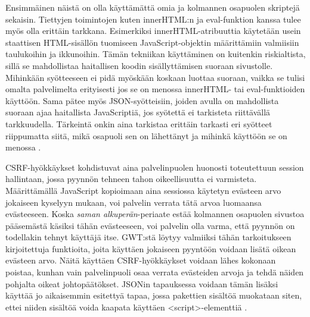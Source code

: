 Ensimmäinen näistä on olla käyttämättä omia ja kolmannen osapuolen skriptejä sekaisin. Tiettyjen toimintojen kuten innerHTML:n ja eval-funktion kanssa tulee myös olla erittäin tarkkana.
Esimerkiksi innerHTML-atribuuttia käytetään usein staattisen HTML-sisällön tuomiseen JavaScript-objektin määrittämiin valmiisiin taulukoihin ja ikkunoihin. Tämän tekniikan käyttäminen on 
kuitenkin riskialtista, sillä se mahdollistaa haitallisen koodin sisällyttämisen suoraan sivustolle. Mihinkään syötteeseen ei pidä myöskään koskaan luottaa suoraan, vaikka se tulisi omalta 
palvelimelta erityisesti jos se on menossa innerHTML- tai eval-funktioiden käyttöön. Sama pätee myös JSON-syötteisiin, joiden avulla on mahdollista suoraan ajaa haitallista JavaScriptiä, jos 
syötettä ei tarkisteta riittävällä tarkkuudella. Tärkeintä onkin aina tarkistaa erittäin tarkasti eri syötteet riippumatta siitä, mikä osapuoli sen on lähettänyt ja mihinkä käyttöön se on
menossa \cite{GWTsecurity}.

CSRF-hyökkäykset kohdistuvat aina palvelinpuolen huonosti toteutettuun session hallintaan, jossa pyynnön tehneen tahon oikeellisuutta ei varmisteta. Määrittämällä JavaScript kopioimaan aina 
sessiossa käytetyn evästeen arvo jokaiseen kyselyyn mukaan, voi palvelin verrata tätä arvoa luomaansa evästeeseen. Koska \emph{saman alkuperän}-periaate estää kolmannen osapuolen sivustoa 
pääsemästä käsiksi tähän evästeeseen, voi palvelin olla varma, että pyynnön on todellakin tehnyt käyttäjä itse. GWT:stä löytyy valmiiksi tähän tarkoitukseen kirjoitettuja funktioita, joita
käyttäen jokaiseen pyyntöön voidaan lisätä oikean evästeen arvo. Näitä käyttäen CSRF-hyökkäykset voidaan lähes kokonaan poistaa, kunhan vain palvelinpuoli osaa verrata evästeiden arvoja 
ja tehdä näiden pohjalta oikeat johtopäätökset. JSONin tapauksessa voidaan tämän lisäksi käyttää jo aikaisemmin esitettyä tapaa, jossa pakettien sisältöä muokataan siten, ettei niiden
sisältöä voida kaapata käyttäen <script>-elementtiä \cite{GWTsecurity}.

